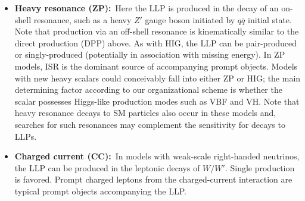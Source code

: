 \begin{itemize}
\item {\bf Heavy resonance (ZP):}~Here the LLP is produced in the decay of an on-shell resonance, such as a heavy $Z'$ gauge boson initiated by $q\bar{q}$ initial state. Note that production via an off-shell resonance is kinematically similar to the direct production (DPP) above.  As with HIG, the LLP can be pair-produced or singly-produced (potentially in association with missing energy). In ZP models, ISR is the dominant source of accompanying prompt objects. Models with new heavy scalars could conceivably fall into either ZP or HIG; the main determining factor according to our organizational scheme is whether the scalar possesses Higgs-like production modes such as VBF and VH. Note that heavy resonance decays to SM particles also occur in these models and, searches for such resonances \cite{Khachatryan:2016zqb,Sirunyan:2016iap,Aaboud:2017yvp,Sirunyan:2017dnz,Aaboud:2017buh,Aaboud:2018juj,Aaboud:2018zba} may complement the sensitivity for decays to LLPs.

\item {\bf Charged current (CC):}~In models with weak-scale right-handed neutrinos, the LLP can be produced in the leptonic decays of $W/W'$. Single production is favored.  Prompt charged leptons from the charged-current interaction are typical prompt objects accompanying the LLP.
\end{itemize}
%
